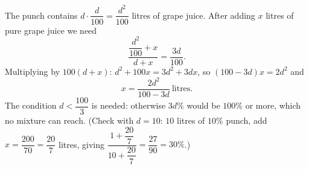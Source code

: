 The punch contains $d\cdot\dfrac{d}{100}=\dfrac{d^2}{100}$ litres of grape juice. After adding $x$ litres of pure grape juice we need
\[
\dfrac{\dfrac{d^2}{100}+x}{d+x}=\dfrac{3d}{100}.
\]
Multiplying by $100(d+x)$: $d^2+100x=3d^2+3dx$, so $(100-3d)x=2d^2$ and
\[
x=\boxed{\dfrac{2d^2}{100-3d}}\ \text{litres}.
\]
The condition $d<\dfrac{100}{3}$ is needed: otherwise $3d\%$ would be $100\%$ or more, which no mixture can reach. (Check with $d=10$: $10$ litres of $10\%$ punch, add $x=\dfrac{200}{70}=\dfrac{20}{7}$ litres, giving $\dfrac{1+\dfrac{20}{7}}{10+\dfrac{20}{7}}=\dfrac{27}{90}=30\%$.)
